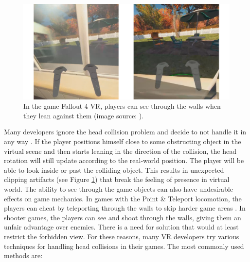 \begin{figure}[th]
\centering
\includegraphics[width=1\textwidth]{img/clipping.png}
\caption{In the game Fallout 4 VR, players can see through the walls when they lean against them (image source: \cite{redditfallout}).}
\label{fig:FALLOUTCLIPPING}
\end{figure}

Many developers ignore the head collision problem and decide to not handle it in any way \cite{OCULUSDOCCLIPPING}. If the player positions himself close to some obstructing object in the virtual scene and then starts leaning in the direction of the collision, the head rotation will still update according to the real-world position. The player will be able to look inside or past the colliding object. This results in unexpected clipping artifacts (see Figure \ref{fig:FALLOUTCLIPPING}) that break the feeling of presence in virtual world. The ability to see through the game objects can also have undesirable effects on game mechanics. In games with the Point \& Teleport locomotion, the players can cheat by teleporting through the walls to skip harder game areas \cite{SKYRIMTELEPORT}. In shooter games, the players can see and shoot through the walls, giving them an unfair advantage over enemies. There is a need for solution that would at least restrict the forbidden view. For these reasons, many VR developers try various techniques for handling head collisions in their games. The most commonly used methods are:


